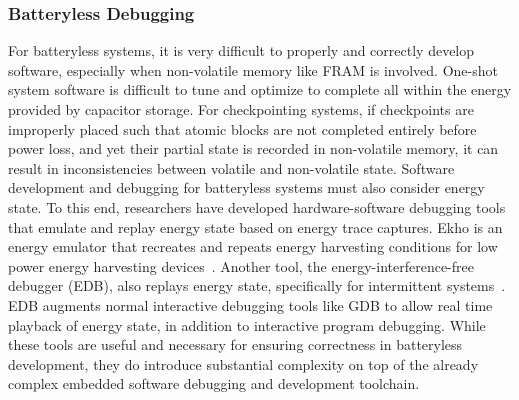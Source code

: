 \subsubsection{Batteryless Debugging}
For batteryless systems, it
is very difficult to properly and correctly develop software, especially when non-volatile memory like FRAM is involved.
One-shot system software is difficult to tune and optimize to complete all within the energy provided by capacitor storage.
For checkpointing systems, if checkpoints are improperly placed such that atomic blocks are not completed entirely before power loss, and yet their partial state is recorded in non-volatile memory,
it can result in inconsistencies between volatile and non-volatile state.
Software development and debugging for batteryless systems must also consider energy state.
To this end, researchers have developed hardware-software debugging tools that emulate and replay energy state based on energy trace captures.
Ekho is an energy emulator that recreates and repeats energy harvesting conditions for low power energy harvesting devices~\cite{hester2014ekho}.
Another tool, the energy-interference-free debugger (EDB), also replays energy state, specifically for intermittent systems~\cite{colin2016energy}.
EDB augments normal interactive debugging tools like GDB to allow real time playback of energy state, in addition to interactive program debugging.
While these tools are useful and necessary for ensuring correctness in batteryless development, they do introduce substantial complexity on top of the already complex embedded software debugging and development toolchain.

